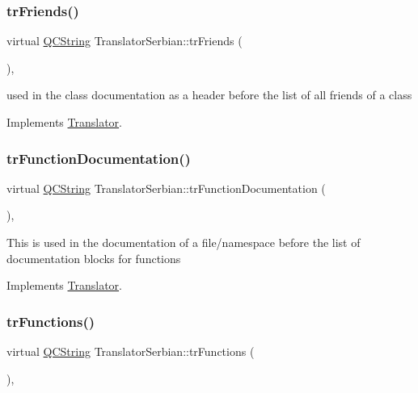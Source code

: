 \subsubsection{\texorpdfstring{trFriends()}{trFriends()}}
{\footnotesize\ttfamily virtual \mbox{\hyperlink{class_q_c_string}{Q\+C\+String}} Translator\+Serbian\+::tr\+Friends (\begin{DoxyParamCaption}{ }\end{DoxyParamCaption})\hspace{0.3cm}{\ttfamily [inline]}, {\ttfamily [virtual]}}

used in the class documentation as a header before the list of all friends of a class 

Implements \mbox{\hyperlink{class_translator}{Translator}}.

\mbox{\label{class_translator_serbian_ad6dadfab3a0cfc54e1a9289ad6028f32}} 
\subsubsection{\texorpdfstring{trFunctionDocumentation()}{trFunctionDocumentation()}}
{\footnotesize\ttfamily virtual \mbox{\hyperlink{class_q_c_string}{Q\+C\+String}} Translator\+Serbian\+::tr\+Function\+Documentation (\begin{DoxyParamCaption}{ }\end{DoxyParamCaption})\hspace{0.3cm}{\ttfamily [inline]}, {\ttfamily [virtual]}}

This is used in the documentation of a file/namespace before the list of documentation blocks for functions 

Implements \mbox{\hyperlink{class_translator}{Translator}}.

\mbox{\label{class_translator_serbian_a5590b5948702e405487a7e396fea374e}} 
\subsubsection{\texorpdfstring{trFunctions()}{trFunctions()}}
{\footnotesize\ttfamily virtual \mbox{\hyperlink{class_q_c_string}{Q\+C\+String}} Translator\+Serbian\+::tr\+Functions (\begin{DoxyParamCaption}{ }\end{DoxyParamCaption})\hspace{0.3cm}{\ttfamily [inline]}, {\ttfamily [virtual]}}

